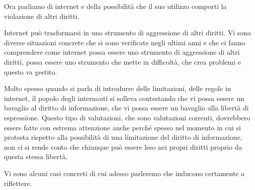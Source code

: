 Ora parliamo di internet e della possibilità che il suo utilizzo comporti la violazione di altri diritti. \par
Internet può trasformarsi in uno strumento di aggressione di altri diritti. Vi sono diverse situazioni concrete che si sono verificate negli ultimi anni e che ci fanno comprendere come internet possa essere uno strumento di aggressione di altri diritti, possa essere uno strumento che mette in difficoltà, che crea problemi e questo va gestito.\par
Molto spesso quando si parla di introdurre delle limitazioni, delle regole in internet, il popolo degli internauti si solleva contestando che vi possa essere un bavaglio al diritto di informazione, che vi possa essere un bavaglio alla libertà di espressione. Questo tipo di valutazioni, che sono valutazioni correnti, dovrebbero essere fatte con estrema attenzione anche perché spesso nel momento in cui si protesta rispetto alla possibilità di una limitazione del diritto di informazione, non ci si rende conto che chiunque può essere leso nei propri diritti proprio da questa stessa libertà.\par
Vi sono alcuni casi concreti di cui adesso parleremo che inducono certamente a riflettere.\par 
